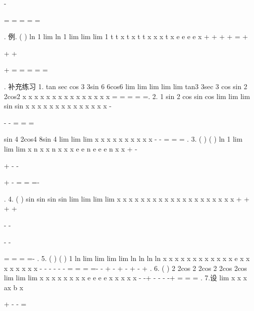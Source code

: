 -




\to \infty 
\to 




\cdots 
=
=
=
=
=








. 
\textcolor{lyred}{例}.
(
)
ln 1
lim
ln 1
lim
lim
lim 1
t
t
x
t
x
t
t
x
x
x
t
x
e
e
e
e
x
+
\to +\infty 
\to +\infty 
\to 
+
=
+


+
+




\to 


+
=
=
=
=
=




. 
\textcolor{lyred}{补充练习 }
1.
tan
sec
cos 3
3sin 6
6cos6
lim
lim
lim
lim
lim
tan3
3sec 3
cos
sin 2
2cos2
x
x
x
x
x
x
x
x
x
x
x
x
x
x
x
\pi 
\pi 
\pi 
\pi 
\pi 
\to 
\to 
\to 
\to 
\to 
=
=
=
=
=. 
2.
1 sin 2
cos
sin
cos
lim
lim
lim
sin
sin
x
x
x
x
x
x
x
x
x
x
x
x
x
x
\to 
\to 
\to 
-


-
-
=
=
=




sin 4
2cos4
8sin 4
lim
lim
lim
x
x
x
x
x
x
x
x
x
x
\to 
\to 
\to 
-
-
=
=
=
. 
3.
(
)
(
)
ln 1
lim
lim
lim
x
n
x
x
n
x
x
x
e
e
n
e
e
e
n
x
x
+
-
\to \infty 
\to 
\to 


+
-
-


+
-
=
=
=-










. 
4.
(
)
sin
sin
sin
sin
lim
lim
lim
lim
x
x
x
x
x
x
x
x
x
x
x
x
x
x
x
x
x
x
x
x
+
+
+
+
\to 
\to 
\to 
\to 




-
-




-
-




=
=
=
=-
. 
5.
(
)
(
)
1 ln
lim
lim
lim
lim
ln
ln
ln
ln
x
x
x
x
x
x
x
x
x
x
x
x
e
x
x
x
x
x
x
x
x
-
-
\to 
\to 
\to 
\to 
-
-
-
-
=
=
=
=-
-
+
-
+
-
+
-
+
. 
6.
(
)
2 2cos
2 2cos
2 2cos
2cos
lim
lim
lim
x
x
x
x
x
x
x
x
e
e
e
e
x
x
x
x
x
-
-+
-
\to 
\to 
\to 
-
-
-+
=
=
=
. 
7.设
lim
x
x
x
ax
b
x
\to \infty 




+
-
-
=










